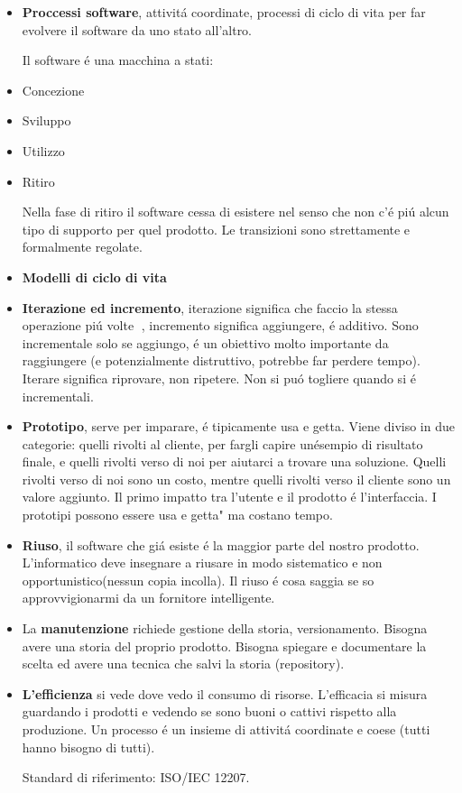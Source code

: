 \documentclass[a4paper,10pt] {article}
\begin{document}
\begin{itemize}
	
\item \textbf{Proccessi software}, attivit\'a coordinate, processi di ciclo di vita per far evolvere il software da uno stato all'altro.

Il software \'e una macchina a stati:
	\item Concezione
	\item Sviluppo
	\item Utilizzo
	\item Ritiro
	
Nella fase di ritiro il software cessa di esistere nel senso che non c'\'e pi\'u alcun tipo di supporto per quel prodotto.
Le transizioni sono strettamente e formalmente regolate.


\item \textbf{Modelli di ciclo di vita}

\item \textbf{Iterazione ed incremento}, iterazione significa che faccio la 
stessa operazione pi\'u volte , incremento significa aggiungere, \'e additivo. 
Sono incrementale solo se aggiungo, \'e un obiettivo molto importante da 
raggiungere (e potenzialmente distruttivo, potrebbe far perdere tempo). Iterare 
significa riprovare, non ripetere. Non si pu\'o togliere quando si \'e 
incrementali.

\item \textbf{Prototipo}, serve per imparare, \'e tipicamente usa e getta. Viene diviso in due categorie: quelli rivolti al cliente, per fargli capire un\' esempio di risultato finale, e quelli rivolti verso di noi per aiutarci a trovare una soluzione. Quelli rivolti verso di noi sono un costo, mentre quelli rivolti verso il cliente sono un valore aggiunto. Il primo impatto tra l'utente e il prodotto \'e l'interfaccia. I prototipi possono essere usa e getta" ma costano tempo.

\item \textbf{Riuso}, il software che gi\'a esiste \'e la maggior parte del nostro prodotto. L'informatico deve insegnare a riusare in modo sistematico e non opportunistico(nessun copia incolla). Il riuso \'e cosa saggia se so approvvigionarmi da un fornitore intelligente.

\item La \textbf{manutenzione} richiede gestione della storia, versionamento. 
Bisogna avere una storia del proprio prodotto. Bisogna spiegare e documentare 
la scelta ed avere una tecnica che salvi la storia (repository).

\item \textbf{L'efficienza} si vede dove vedo il consumo di risorse. 
L'efficacia si 
misura guardando i prodotti e vedendo se sono buoni o cattivi rispetto alla 
produzione. Un processo \'e un insieme di attivit\'a coordinate e coese (tutti 
hanno bisogno di tutti).

Standard di riferimento: ISO/IEC 12207.	
\end{itemize}
\end{document}

